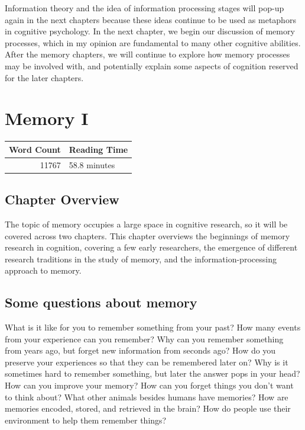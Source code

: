 \documentclass[
  oneside,
  12pt]{crumpbook}
\begin{document}
Information theory and the idea of information processing stages will pop-up again in the next chapters because these ideas continue to be used as metaphors in cognitive psychology. In the next chapter, we begin our discussion of memory processes, which in my opinion are fundamental to many other cognitive abilities. After the memory chapters, we will continue to explore how memory processes may be involved with, and potentially explain some aspects of cognition reserved for the later chapters.

\hypertarget{memory-i}{%
\chapter{Memory I}\label{memory-i}}

\begin{tabular}{r|l}
\hline
Word Count & Reading Time\\
\hline
11767 & 58.8 minutes\\
\hline
\end{tabular}

\hypertarget{chapter-overview-5}{%
\section{Chapter Overview}\label{chapter-overview-5}}

The topic of memory occupies a large space in cognitive research, so it will be covered across two chapters. This chapter overviews the beginnings of memory research in cognition, covering a few early researchers, the emergence of different research traditions in the study of memory, and the information-processing approach to memory.

\hypertarget{some-questions-about-memory}{%
\section{Some questions about memory}\label{some-questions-about-memory}}

What is it like for you to remember something from your past? How many events from your experience can you remember? Why can you remember something from years ago, but forget new information from seconds ago? How do you preserve your experiences so that they can be remembered later on? Why is it sometimes hard to remember something, but later the answer pops in your head? How can you improve your memory? How can you forget things you don't want to think about? What other animals besides humans have memories? How are memories encoded, stored, and retrieved in the brain? How do people use their environment to help them remember things?
\end{document}
